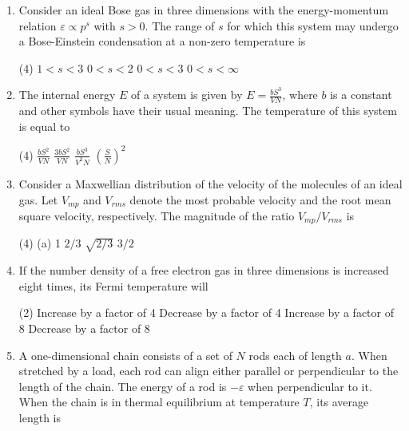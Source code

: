 \begin{enumerate}
	\item Consider an ideal Bose gas in three dimensions with the energy-momentum relation $\varepsilon \propto p^{s}$ with $s>0$. The range of $s$ for which this system may undergo a Bose-Einstein condensation at a non-zero temperature is
	{}
	\begin{tasks}(4)
		\task[\textbf{A.}] $1<s<3$
		\task[\textbf{B.}] $0<s<2$
		\task[\textbf{C.}] $0<s<3$
		\task[\textbf{D.}] $0<s<\infty$
	\end{tasks}
	\item The internal energy $E$ of a system is given by $E=\frac{b S^{3}}{V N}$, where $b$ is a constant and other symbols have their usual meaning. The temperature of this system is equal to
	{}
	\begin{tasks}(4)
		\task[\textbf{A.}] $\frac{b S^{2}}{V N}$
		\task[\textbf{B.}] $\frac{3 b S^{2}}{V N}$
		\task[\textbf{C.}]  $\frac{b S^{3}}{V^{2} N}$
		\task[\textbf{D.}] $\left(\frac{S}{N}\right)^{2}$
	\end{tasks}
	\item Consider a Maxwellian distribution of the velocity of the molecules of an ideal gas. Let $V_{m p}$ and $V_{r m s}$ denote the most probable velocity and the root mean square velocity, respectively. The magnitude of the ratio $V_{m p} / V_{r m s}$ is
	{}
	\begin{tasks}(4)
		\task[\textbf{A.}] (a) 1
		\task[\textbf{B.}] $2 / 3$
		\task[\textbf{C.}] $\sqrt{2 / 3}$
		\task[\textbf{D.}] $3 / 2$
	\end{tasks}
	\item If the number density of a free electron gas in three dimensions is increased eight times, its Fermi temperature will
	{}
	\begin{tasks}(2)
		\task[\textbf{A.}] Increase by a factor of 4
		\task[\textbf{B.}] Decrease by a factor of 4
		\task[\textbf{C.}] Increase by a factor of 8
		\task[\textbf{D.}] Decrease by a factor of 8
	\end{tasks}
	\item A one-dimensional chain consists of a set of $N$ rods each of length $a$. When stretched by a load, each rod can align either parallel or perpendicular to the length of the chain. The energy of a rod is $-\varepsilon$ when perpendicular to it. When the chain is in thermal equilibrium at temperature $T$, its average length is
	{}

\end{enumerate}
